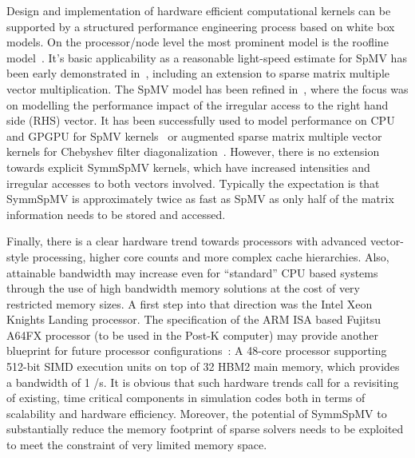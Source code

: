 	
Design and implementation of hardware efficient computational kernels can be supported by a structured performance engineering process based on white box models. On the processor/node level the most prominent model is the roofline model~\cite{Williams_roofline}. It's basic applicability as a reasonable light-speed estimate for \acrshort{SpMV} has been early demonstrated in~\cite{Gropp:1999}, including an extension to sparse matrix multiple vector multiplication. The \acrshort{SpMV} model has been refined in~\cite{Moritz_sell}, where the focus was on modelling the performance impact of the irregular access to the  right hand side (RHS) vector. It has been successfully used to model performance on CPU and GPGPU for \acrshort{SpMV} kernels~\cite{Moritz_sell} or augmented sparse matrix multiple vector kernels for Chebyshev filter diagonalization~\cite{ISC2018:ChebFD}. However, there is no extension towards explicit \acrshort{SymmSpMV} kernels, which have increased intensities and irregular accesses to both vectors involved. Typically the expectation is that \acrshort{SymmSpMV} is approximately twice as fast as \acrshort{SpMV} as only half of the matrix information needs to be stored and accessed. 

Finally, there is a clear hardware trend towards processors with advanced vector-style processing, higher core counts and more complex cache hierarchies. Also, attainable bandwidth may increase even for ``standard'' CPU based systems through the use of high bandwidth memory solutions at the cost of very restricted memory sizes. A first step into that direction was the Intel Xeon Knights Landing processor. The specification of the ARM ISA based Fujitsu A64FX processor (to be used in the Post-K computer) may provide another blueprint for future processor configurations~\cite{Post-K:Processor}: A 48-core processor supporting 512-bit SIMD execution units on top of 32 \GB HBM2 main memory, which provides a bandwidth of 1 \TB/s.  It is obvious that such hardware trends call for a revisiting of existing, time critical components in simulation codes both in terms of scalability and hardware efficiency. Moreover, the potential of \acrshort{SymmSpMV} to substantially reduce the memory footprint of sparse solvers needs to be exploited to meet the constraint of very limited memory space. 

